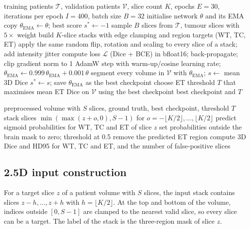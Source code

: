 \begin{algorithm}[htbp]
\caption{Training one model on one fold}\label{alg:train}
\begin{algorithmic}[1]
\REQUIRE training patients $\mathcal{T}$, validation patients $\mathcal{V}$, slice count $K$, epochs $E=30$, iterations per epoch $I=400$, batch size $B=32$
\STATE initialise network $\theta$ and its EMA copy $\theta_{\mathrm{EMA}} \leftarrow \theta$; best score $s^{*} \leftarrow -1$
    \STATE sample $B$ slices from $\mathcal{T}$, tumour slices with $5\times$ weight
    \STATE build $K$-slice stacks with edge clamping and region targets (WT, TC, ET)
    \STATE apply the same random flip, rotation and scaling to every slice of a stack; add intensity jitter
    \STATE compute loss $\mathcal{L}$ (Dice + BCE) in bfloat16; back-propagate; clip gradient norm to 1
    \STATE AdamW step with warm-up/cosine learning rate; $\theta_{\mathrm{EMA}} \leftarrow 0.999\,\theta_{\mathrm{EMA}} + 0.001\,\theta$
  \ENDFOR
    \STATE segment every volume in $\mathcal{V}$ with $\theta_{\mathrm{EMA}}$; $s \leftarrow$ mean 3D Dice
      \STATE $s^{*} \leftarrow s$; save $\theta_{\mathrm{EMA}}$ as the best checkpoint
    \ENDIF
  \ENDIF
\ENDFOR
\STATE choose ET threshold $T$ that maximises mean ET Dice on $\mathcal{V}$ using the best checkpoint
\RETURN best checkpoint and $T$
\end{algorithmic}
\end{algorithm}

\begin{algorithm}[htbp]
\caption{Segmenting and scoring one test patient}\label{alg:infer}
\begin{algorithmic}[1]
\REQUIRE preprocessed volume with $S$ slices, ground truth, best checkpoint, threshold $T$
  \STATE stack slices $\min(\max(z+o,0),S-1)$ for $o = -\lfloor K/2 \rfloor, \dots, \lfloor K/2 \rfloor$
  \STATE predict sigmoid probabilities for WT, TC and ET of slice $z$
\ENDFOR
\STATE set probabilities outside the brain mask to zero; threshold at 0.5
  \STATE remove the predicted ET region
\ENDIF
\STATE compute 3D Dice and HD95 for WT, TC and ET, and the number of false-positive slices
\end{algorithmic}
\end{algorithm}

\subsection{2.5D input construction}
For a target slice $z$ of a patient volume with $S$ slices, the input stack contains slices $z-h, \dots, z+h$ with $h = \lfloor K/2 \rfloor$. At the top and bottom of the volume, indices outside $[0, S-1]$ are clamped to the nearest valid slice, so every slice can be a target. The label of the stack is the three-region mask of slice $z$.

